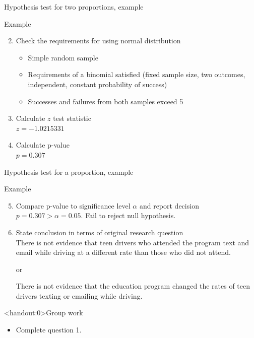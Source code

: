 \documentclass[xcolor=table, aspectratio=169, bigger]{beamer}
\begin{document}
\begin{frame}{Hypothesis test for two proportions, example}
\begin{exampleblock}{Example}
\begin{enumerate}
\setcounter{enumi}{1}
\item Check the requirements for using normal distribution
\pause\begin{itemize}
\item Simple random sample
\item Requirements of a binomial satisfied (fixed sample size, two outcomes, independent, constant probability of success)
\item Successes and failures from both samples exceed 5
\end{itemize}
\pause\item Calculate $z$ test statistic\\
\pause$z = -1.0215331$
\pause\item Calculate p-value\\
\pause$p = 0.307$
\end{enumerate}
\end{exampleblock}
\end{frame}

\begin{frame}{Hypothesis test for a proportion, example}
\begin{exampleblock}{Example}
\begin{enumerate}
\setcounter{enumi}{4}
\item Compare p-value to significance level $\alpha$ and report decision\\
\pause$p = 0.307 > \alpha =0.05$. Fail to reject null hypothesis.

\pause\item State conclusion in terms of original research question\\
\pause There is not evidence that teen drivers who attended the program text and email while driving at a different rate than those who did not attend.\\
{\centering or \par}\smallskip
There is not evidence that the education program changed the rates of teen drivers texting or emailing while driving.
\end{enumerate}

\end{exampleblock}
\end{frame}

\begin{frame}<handout:0>{Group work}
\begin{block}{}
\large
\begin{itemize}
\item Complete question 1.
\end{itemize}
\end{block}
\end{frame}
\end{document}
